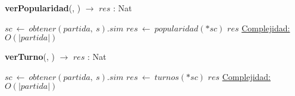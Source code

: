 \begin{Algoritmos}
    \begin{algorithm}[H]{\textbf{verPopularidad}(, ) $\to$ $res$ : Nat}
    \begin{algorithmic}[1]
        \State $sc\ \leftarrow\ obtener(partida,\ s).sim$
        \State $res\ \leftarrow\ popularidad(*sc)$
        \State \Return $res$
        \medskip
        \Statex \underline{Complejidad:} $O(|partida|)$
    \end{algorithmic}
    \end{algorithm}

    \begin{algorithm}[H]{\textbf{verTurno}(, ) $\to$ $res$ : Nat}
    \begin{algorithmic}[1]
        \State $sc\ \leftarrow\ obtener(partida,\ s).sim$
        \State $res\ \leftarrow\ turnos(*sc)$
        \State \Return $res$
        \medskip
        \Statex \underline{Complejidad:} $O(|partida|)$
    \end{algorithmic}
    \end{algorithm}

\end{Algoritmos}
    